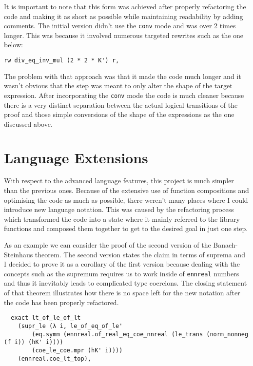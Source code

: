 \documentclass[11pt]{article}
\newenvironment{code}{\captionsetup{type=listing}}{}
\begin{document}
It is important to note that this form was achieved after properly refactoring the
code and making it as short as possible while maintaining readability by adding comments.
The initial version didn't use the \texttt{conv} mode and was over 2 times longer.
This was because it involved numerous targeted rewrites such as the one below:
\begin{code}
\begin{verbatim}
rw div_eq_inv_mul (2 * 2 * K') r,
\end{verbatim}
\end{code}
The problem with that approach was that it made the code much longer and it wasn't
obvious that the step was meant to only alter the shape of the target expression.
After incorporating the \texttt{conv} mode the code is much cleaner because there
is a very distinct separation between the actual logical transitions of the proof
and those simple conversions of the shape of the expressions as the one discussed above.

\section*{Language Extensions}
With respect to the advanced language features, this project is much simpler than
the previous ones. Because of the extensive use of function compositions and
optimising the code as much as possible, there weren't many places where I could
introduce new language notation. This was caused by the refactoring process which
transformed the code into a state where it mainly referred to the library functions
and composed them together to get to the desired goal in just one step.

As an example we can consider the proof of the second version of the Banach-Steinhaus theorem.
The second version states the claim in terms of suprema and I decided to prove
it as a corollary of the first version because dealing with the concepts
such as the supremum requires us to work inside of \texttt{ennreal} numbers and
thus it inevitably leads to complicated type coercions. The closing statement of
that theorem illustrates how there is no space left for the new notation after the
code has been properly refactored.
\begin{code}
\begin{verbatim}
  exact lt_of_le_of_lt
    (supr_le (λ i, le_of_eq_of_le'
        (eq.symm (ennreal.of_real_eq_coe_nnreal (le_trans (norm_nonneg (f i)) (hK' i))))
        (coe_le_coe.mpr (hK' i))))
    (ennreal.coe_lt_top),
\end{verbatim}
\end{code}
\end{document}
